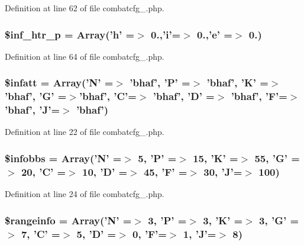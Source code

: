 Definition at line 62 of file combatcfg\+\_.\+php.

\hypertarget{combatcfg__1_8php_adad1350ad8f9f69dfd978f5b3e750463}{
\subsubsection[{\$inf\+\_\+htr\+\_\+p}]{\setlength{\rightskip}{0pt plus 5cm}\$inf\+\_\+htr\+\_\+p = Array('h' =$>$ 0.,'i'=$>$ 0.,'e' =$>$ 0.)}}\label{combatcfg__1_8php_adad1350ad8f9f69dfd978f5b3e750463}


Definition at line 64 of file combatcfg\+\_.\+php.

\hypertarget{combatcfg__1_8php_a64a1cbe5826ab0a52fbad2eb81f37960}{
\subsubsection[{\$infatt}]{\setlength{\rightskip}{0pt plus 5cm}\$infatt = Array('N' =$>$ 'bhaf', 'P' =$>$ 'bhaf', 'K' =$>$'bhaf', 'G' =$>$'bhaf', 'C'=$>$ 'bhaf', 'D' =$>$ 'bhaf', 'F'=$>$ 'bhaf', 'J'=$>$ 'bhaf')}}\label{combatcfg__1_8php_a64a1cbe5826ab0a52fbad2eb81f37960}


Definition at line 22 of file combatcfg\+\_.\+php.

\hypertarget{combatcfg__1_8php_a98ce8e2b93f331e535f1912e2b66aefd}{
\subsubsection[{\$infobbs}]{\setlength{\rightskip}{0pt plus 5cm}\$infobbs = Array('N' =$>$ 5, 'P' =$>$ 15, 'K' =$>$ 55, 'G' =$>$ 20, 'C' =$>$ 10, 'D' =$>$ 45, 'F' =$>$ 30, 'J'=$>$ 100)}}\label{combatcfg__1_8php_a98ce8e2b93f331e535f1912e2b66aefd}


Definition at line 24 of file combatcfg\+\_.\+php.

\hypertarget{combatcfg__1_8php_a8c21a6a396577f4f203cd5a67dd4ad5b}{
\subsubsection[{\$rangeinfo}]{\setlength{\rightskip}{0pt plus 5cm}\$rangeinfo = Array('N' =$>$ 3, 'P' =$>$ 3, 'K' =$>$ 3, 'G' =$>$ 7, 'C' =$>$ 5, 'D' =$>$ 0, 'F'=$>$ 1, 'J'=$>$ 8)}}\label{combatcfg__1_8php_a8c21a6a396577f4f203cd5a67dd4ad5b}


